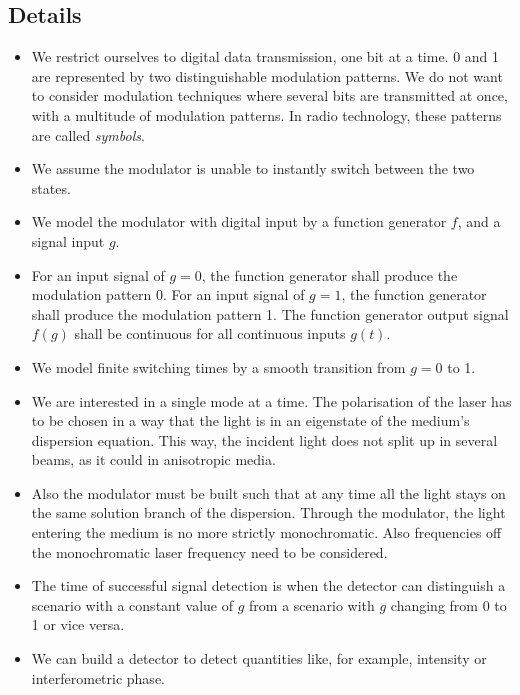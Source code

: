 \documentclass[12pt,a4paper,twoside,openright,BCOR10mm,headsepline,titlepage,abstracton,chapterprefix,final]{scrreprt}
\begin{document}
\subsection{Details}
\begin{itemize}
 \item We restrict ourselves to digital data transmission, one bit at a time.
       0 and 1 are represented by two distinguishable modulation patterns.
       We do not want to consider modulation techniques where several bits are transmitted at once,
       with a multitude of modulation patterns.
       In radio technology, these patterns are called \emph{symbols}.
 \item We assume the modulator is unable to instantly switch between the two states.
 \item We model the modulator with digital input by a function generator $f$, 
       and a signal input $g$.
 \item For an input signal of $g=0$, the function generator shall produce the modulation pattern 0.
       For an input signal of $g=1$, the function generator shall produce the modulation pattern 1.
       The function generator output signal $f(g)$ shall be continuous 
       for all continuous inputs $g(t)$.
 \item We model finite switching times by a smooth transition from $g=0$ to 1.
 \item We are interested in a single mode at a time. 
       The polarisation of the laser has to be chosen in a way 
       that the light is in an eigenstate of the medium's dispersion equation.
       This way, the incident light does not split up in several beams, as it could in anisotropic media. 
 \item Also the modulator must be built 
       such that at any time all the light stays on the same solution branch of the dispersion.
       Through the modulator, the light entering the medium is no more strictly monochromatic. 
       Also frequencies off the monochromatic laser frequency need to be considered.
 \item The time of successful signal detection is when the detector can distinguish 
       a scenario with a constant value of $g$ from a scenario with $g$ changing from 0 to 1 or vice versa. 
 \item We can build a detector to detect quantities like, for example, intensity or interferometric phase.
\end{itemize}
\end{document}
